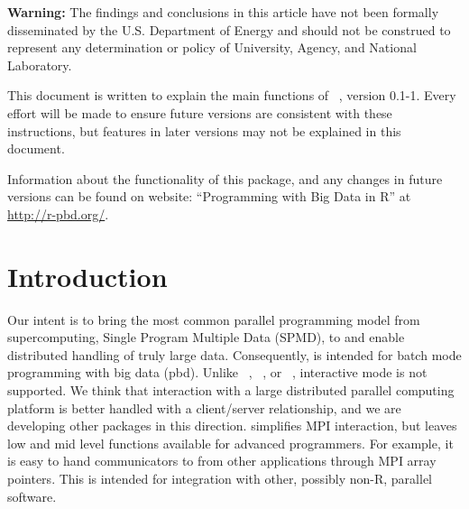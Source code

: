 
{\color{red} \bf Warning:}
The findings and conclusions in this article have not been
formally disseminated by the U.S. Department of Energy
and should not be construed to represent any determination or
policy of University, Agency, and National Laboratory.

This document is written to explain the main
functions of ~\citep{Chen2012}, version 0.1-1.
Every effort will be made to ensure future versions are consistent with
these instructions, but features in later versions may not be explained
in this document.

Information about the functionality of this package,
and any changes in future versions can be found on website:
``Programming with Big Data in R'' at
\url{http://r-pbd.org/}.




\section[Introduction]{Introduction}
\label{sec:introduction}

Our intent is to bring the most common parallel programming model from
supercomputing, Single Program Multiple Data (SPMD), to 
and enable distributed handling of truly large data. Consequently,
 is intended for batch mode programming with big data
(pbd). Unlike ~\citep{Yu2010},
~\citep{Tierney2012}, or ~\citep{Rcore},
interactive mode is not supported.  We think that interaction with a
large distributed parallel computing platform is better handled with a
client/server relationship, and we are developing other packages in
this direction.   simplifies MPI interaction, but leaves
low and mid level functions available for advanced programmers. For
example, it is easy to hand communicators to  from other
applications through MPI array pointers. This is intended for
integration with other, possibly non-R, parallel software.


